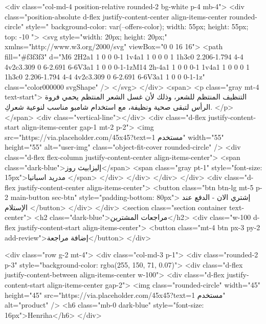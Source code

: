         <div class="col-md-4 position-relative rounded-2 bg-white p-4 mb-4">
          <div class="position-absolute d-flex justify-content-center align-items-center rounded-circle" style="
              background-color: var(--offers-color);
              width: 55px;
              height: 55px;
              top: -10%
            ">
            <svg style="width: 20px; height: 20px;" xmlns="http://www.w3.org/2000/svg" viewBox="0 0 16 16">
              <path fill="#f3f3f3"
                d="M6 2H2a1 1 0 0 0-1 1v4a1 1 0 0 0 1 1h3c0 2.206-1.794 4-4 4v2c3.309 0 6-2.691 6-6V3a1 1 0 0 0-1-1zM14 2h-4a1 1 0 0 0-1 1v4a1 1 0 0 0 1 1h3c0 2.206-1.794 4-4 4v2c3.309 0 6-2.691 6-6V3a1 1 0 0 0-1-1z"
                class="color000000 svgShape" />
            </svg>
          </div>
          <span>
            <p class="gray mt-4 text-start">
              التنظيف المنتظم للشعر، وذلك لأن غسل الشعر المنتظم يحمي فروة الرأس
              لتبقى صحية ونظيفة، مع استخدام شامبو مناسب لنوعية شعركِ.
            </p>
          </span>
          <div class="vertical-line"></div>
          <div class="d-flex justify-content-start align-items-center gap-1 mt-2 p-2">
            <img src="https://via.placeholder.com/45x45?text=مستخدم 1" width="55" height="55" alt="user-img"
              class="object-fit-cover rounded-circle" />
            <div class="d-flex flex-column justify-content-center align-items-center">
              <span class="dark-blue">إليزابيث روز</span>
              <span class="gray pt-1" style="font-size: 15px">مدريد اسبانيا
              </span>
            </div>
          </div>
        </div>
      </div>
      <div class="d-flex justify-content-center align-items-center">
        <button class="btn btn-lg mt-5 p-2 main-button sec-btn" style="padding-bottom: 80px">
          إشتري الان - الدفع عند الإستلام
        </button>
      </div>
    </div>
    <section class="section container text-center">
      <h2 class="dark-blue">مراجعات المشترين</h2>
      <div class="w-100 d-flex justify-content-start align-items-center">
        <button class="mt-4 btn px-3 py-2 add-review">إضافة مراجعة</button>
      </div>

      <div class="row g-2 mt-4">
        <div class="col-md-3 p-1">
          <div class="rounded-2 p-3" style="background-color: rgba(255, 150, 71, 0.07)">
            <div class="d-flex justify-content-between align-items-center w-100">
              <div class="d-flex justify-content-start align-items-center gap-2">
                <img class="rounded-circle" width="45" height="45"
                  src="https://via.placeholder.com/45x45?text=مستخدم 1" alt="product" />
                <h6 class="mb-0 dark-blue" style="font-size: 16px">Henriha</h6>
              </div>

